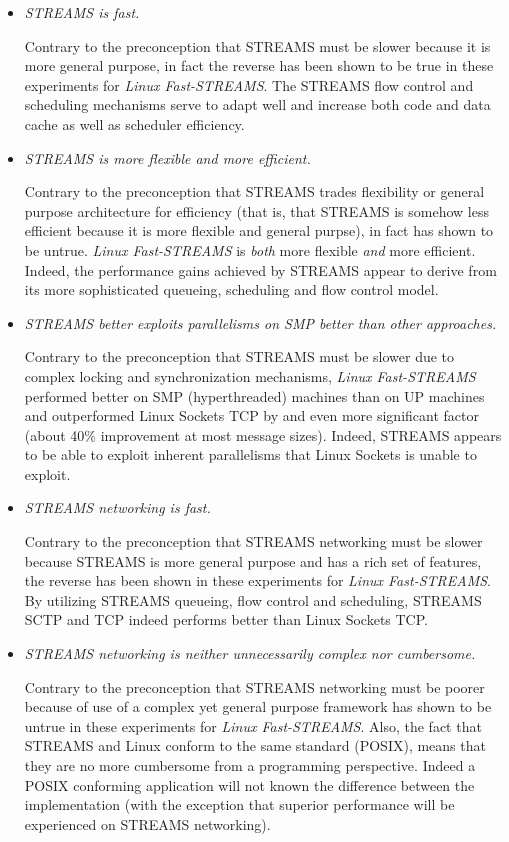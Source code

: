 \documentclass[letterpaper,final,notitlepage,twocolumn,10pt,twoside]{article}
\begin{document}
\begin{itemize}

\item \textit{STREAMS is fast.}

Contrary to the preconception that STREAMS must be slower because it is more general purpose, in
fact the reverse has been shown to be true in these experiments for \textsl{Linux Fast-STREAMS}.
The STREAMS flow control and scheduling mechanisms serve to adapt well and increase both code and
data cache as well as scheduler efficiency.

\item \textit{STREAMS is more flexible {\em and} more efficient.}

Contrary to the preconception that STREAMS trades flexibility or general purpose architecture for
efficiency (that is, that STREAMS is somehow less efficient because it is more flexible and general
purpse), in fact has shown to be untrue.  \textsl{Linux Fast-STREAMS} is {\em both} more flexible
{\em and} more efficient.  Indeed, the performance gains achieved by  STREAMS appear to derive from
its more sophisticated queueing, scheduling and flow control model.

\item \textit{STREAMS better exploits parallelisms on SMP better than other approaches.}

Contrary to the preconception that STREAMS must be slower due to complex locking and synchronization
mechanisms, \textsl{Linux Fast-STREAMS} performed better on SMP (hyperthreaded) machines than on UP
machines and outperformed Linux Sockets TCP by and even more significant factor (about 40\%
improvement at most message sizes).  Indeed, STREAMS appears to be able to exploit inherent
parallelisms that Linux Sockets is unable to exploit.

\item \textit{STREAMS networking is fast.}

Contrary to the preconception that STREAMS networking must be slower because STREAMS is more general
purpose and has a rich set of features, the reverse has been shown in these experiments for
\textsl{Linux Fast-STREAMS}.  By utilizing STREAMS queueing, flow control and scheduling, STREAMS
SCTP and TCP indeed performs better than Linux Sockets TCP.

\item \textit{STREAMS networking is neither unnecessarily complex nor cumbersome.}

Contrary to the preconception that STREAMS networking must be poorer because of use of a complex yet
general purpose framework has shown to be untrue in these experiments for \textsl{Linux
Fast-STREAMS}.  Also, the fact that STREAMS and Linux conform to the same standard (POSIX), means
that they are no more cumbersome from a programming perspective.  Indeed a POSIX conforming
application will not known the difference between the implementation (with the exception that
superior performance will be experienced on STREAMS networking).

\end{itemize}
\end{document}
